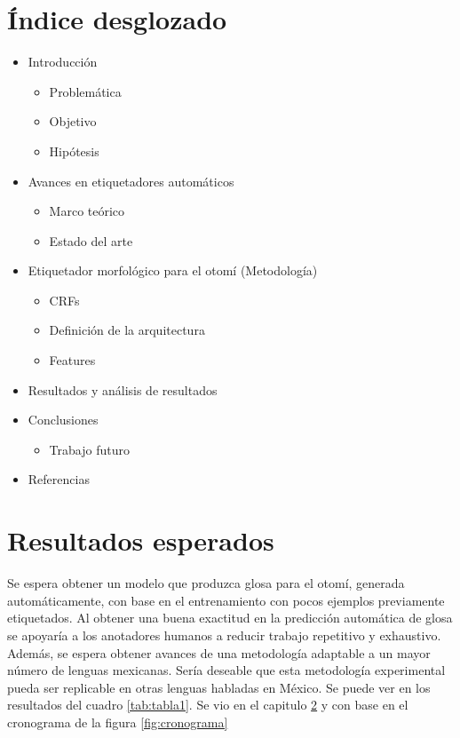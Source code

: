 \documentclass{article}
\begin{document}
\section{Índice desglozado}
\begin{itemize}
    \item Introducción
    \begin{itemize}
        \item Problemática
        \item Objetivo
        \item Hipótesis
    \end{itemize}
    \item Avances en etiquetadores automáticos
    \begin{itemize}
        \item Marco teórico
        \item Estado del arte
    \end{itemize}
    \item Etiquetador morfológico para el otomí (Metodología)
    \begin{itemize}
        \item CRFs
        \item Definición de la arquitectura
        \item Features
    \end{itemize}
    \item Resultados y análisis de resultados
    \item Conclusiones
    \begin{itemize}
        \item Trabajo futuro
    \end{itemize}
    \item Referencias
\end{itemize}

\section{Resultados esperados} \label{sec:resultados}
Se espera obtener un modelo que produzca glosa para el otomí, generada
automáticamente, con base en el entrenamiento con pocos ejemplos previamente
etiquetados. Al obtener una buena exactitud en la predicción automática de
glosa se apoyaría a los anotadores humanos a reducir trabajo repetitivo y
exhaustivo. Además, se espera obtener avances de una metodología adaptable a un
mayor número de lenguas mexicanas. Sería deseable que esta metodología
experimental pueda ser replicable en otras lenguas habladas en México. Se puede
ver en los resultados del cuadro \ref{tab:tabla1}. Se vio en el capitulo
\ref{sec:resultados} y con base en el cronograma de la figura \ref{fig:cronograma}
\end{document}
